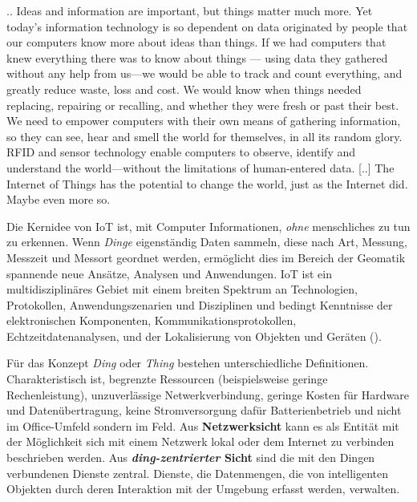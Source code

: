 \documentclass[
  11pt,
  a4paperpaper,
  oneside, openany  ,captions=tableheading
]{scrbook}
\theoremstyle{definition}
\theoremstyle{remark}
\renewenvironment{quote}{\begin{customblockquote}\list{}{\rightmargin=0em\leftmargin=0em}%
\item\relax\color{blockquote-text}\ignorespaces}{\unskip\unskip\endlist\end{customblockquote}}
\begin{document}
\begin{quote}
.. Ideas and information are important, but things matter much more. Yet
today's information technology is so dependent on data originated by
people that our computers know more about ideas than things. If we had
computers that knew everything there was to know about things --- using
data they gathered without any help from us---we would be able to track
and count everything, and greatly reduce waste, loss and cost. We would
know when things needed replacing, repairing or recalling, and whether
they were fresh or past their best. We need to empower computers with
their own means of gathering information, so they can see, hear and
smell the world for themselves, in all its random glory. RFID and sensor
technology enable computers to observe, identify and understand the
world---without the limitations of human-entered data. {[}..{]} The
Internet of Things has the potential to change the world, just as the
Internet did. Maybe even more so.
\end{quote}

Die Kernidee von IoT ist, mit Computer Informationen, \emph{ohne}
menschliches zu tun zu erkennen. Wenn \emph{Dinge} eigenständig Daten
sammeln, diese nach Art, Messung, Messzeit und Messort geordnet werden,
ermöglicht dies im Bereich der Geomatik spannende neue Ansätze, Analysen
und Anwendungen. IoT ist ein multidisziplinäres Gebiet mit einem breiten
Spektrum an Technologien, Protokollen, Anwendungszenarien und
Disziplinen und bedingt Kenntnisse der elektronischen Komponenten,
Kommunikationsprotokollen, Echtzeitdatenanalysen, und der Lokalisierung
von Objekten und Geräten ().

Für das Konzept \emph{Ding} oder \emph{Thing} bestehen unterschiedliche
Definitionen. Charakteristisch ist, begrenzte Ressourcen (beispielsweise
geringe Rechenleistung), unzuverlässige Netwerkverbindung, geringe
Kosten für Hardware und Datenübertragung, keine Stromversorgung dafür
Batterienbetrieb und nicht im Office-Umfeld sondern im Feld. Aus
\textbf{Netzwerksicht} kann es als Entität mit der Möglichkeit sich mit
einem Netzwerk lokal oder dem Internet zu verbinden beschrieben werden.
Aus \textbf{\emph{ding-zentrierter} Sicht} sind die mit den Dingen
verbundenen Dienste zentral. Dienste, die Datenmengen, die von
intelligenten Objekten durch deren Interaktion mit der Umgebung erfasst
werden, verwalten.
\end{document}
